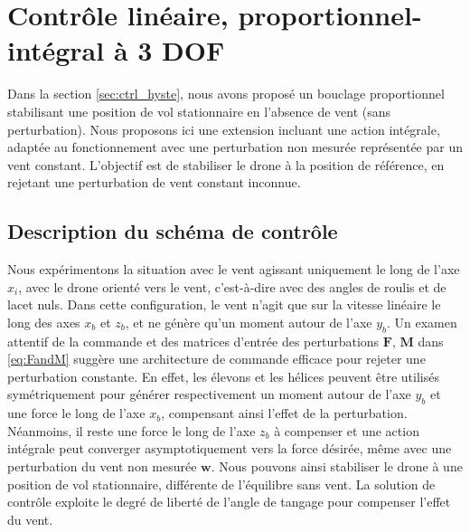 \section{Contrôle linéaire, proportionnel-intégral à 3 DOF}
\label{sec:3dofcmd}
Dans la section \ref{sec:ctrl_hyste}, nous avons proposé un bouclage proportionnel stabilisant une position de vol stationnaire en l'absence de vent (sans perturbation). Nous proposons ici une extension incluant une action intégrale, adaptée au fonctionnement avec une perturbation non mesurée représentée par un vent constant. L'objectif est de stabiliser le drone à la position de référence, en rejetant une perturbation de vent constant inconnue.

\subsection{Description du schéma de contrôle}
Nous expérimentons la situation avec le vent agissant uniquement le long de l'axe $x_{i}$, avec le drone orienté vers le vent, c'est-à-dire avec des angles de roulis et de lacet nuls. Dans cette configuration, le vent n'agit que sur la vitesse linéaire le long des axes $x_{b}$ et $z_{b}$, et ne génère qu'un moment autour de l'axe $y_{b}$. Un examen attentif de la commande et des matrices d'entrée des perturbations $\boldsymbol{F}$, $\boldsymbol{M}$ dans \eqref{eq:FandM} suggère une architecture de commande efficace pour rejeter une perturbation constante. En effet, les élevons et les hélices peuvent être utilisés symétriquement pour générer respectivement un moment autour de l'axe $y_{b}$ et une force le long de l'axe $x_{b}$, compensant ainsi l'effet de la perturbation. Néanmoins, il reste une force le long de l'axe $z_{b}$ à compenser et une action intégrale peut converger asymptotiquement vers la force désirée, même avec une perturbation du vent non mesurée $\boldsymbol{w}$. Nous pouvons ainsi stabiliser le drone à une position de vol stationnaire, différente de l'équilibre sans vent. La solution de contrôle exploite le degré de liberté de l'angle de tangage pour compenser l'effet du vent.

